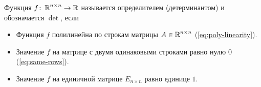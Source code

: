 \documentclass[a4paper,12pt]{article}
\begin{document}
  \begin{definition}
    Функция $f \colon \operatorname{\mathbb R}^{n \times n} \to \operatorname{\mathbb R}$ называется определителем (детерминантом) и обозначается $\det$, если
    \begin{itemize}
      \item Функция $f$ полилинейна по строкам матрицы $A \in \operatorname{\mathbb R}^{n \times n}$ (\ref{eq:poly-linearity}).
      \item Значение $f$ на матрице с двумя одинаковыми строками равно нулю $0$ (\ref{eq:same-rows}).
      \item Значение $f$ на единичной матрице $E_{n \times n}$ равно единице $1$.
    \end{itemize}
  \end{definition}
\end{document}
